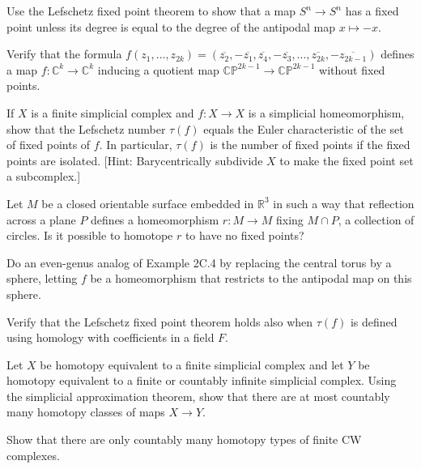 \begin{exercise}
Use the Lefschetz fixed point theorem to show that a map $S^n \to S^n$ has a fixed point unless its degree is equal to the degree of the antipodal map $x \mapsto -x$.
\end{exercise}

\begin{exercise}
Verify that the formula $f(z_1, \ldots, z_{2k}) = (\overline{z_2}, -\overline{z_1}, \overline{z_4}, -\overline{z_3}, \ldots, \overline{z_{2k}}, -\overline{z_{2k-1}})$ defines a map $f: \mathbb{C}^k \to \mathbb{C}^k$ inducing a quotient map $\mathbb{CP}^{2k-1} \to \mathbb{CP}^{2k-1}$ without fixed points.
\end{exercise}

\begin{exercise}
If $X$ is a finite simplicial complex and $f: X \to X$ is a simplicial homeomorphism, show that the Lefschetz number $\tau(f)$ equals the Euler characteristic of the set of fixed points of $f$. In particular, $\tau(f)$ is the number of fixed points if the fixed points are isolated. [Hint: Barycentrically subdivide $X$ to make the fixed point set a subcomplex.]
\end{exercise}

\begin{exercise}
Let $M$ be a closed orientable surface embedded in $\mathbb{R}^3$ in such a way that reflection across a plane $P$ defines a homeomorphism $r: M \to M$ fixing $M \cap P$, a collection of circles. Is it possible to homotope $r$ to have no fixed points?
\end{exercise}

\begin{exercise}
Do an even-genus analog of Example 2C.4 by replacing the central torus by a sphere, letting $f$ be a homeomorphism that restricts to the antipodal map on this sphere.
\end{exercise}

\begin{exercise}
Verify that the Lefschetz fixed point theorem holds also when $\tau(f)$ is defined using homology with coefficients in a field $F$.
\end{exercise}

\begin{exercise}
Let $X$ be homotopy equivalent to a finite simplicial complex and let $Y$ be homotopy equivalent to a finite or countably infinite simplicial complex. Using the simplicial approximation theorem, show that there are at most countably many homotopy classes of maps $X \to Y$.
\end{exercise}

\begin{exercise}
Show that there are only countably many homotopy types of finite CW complexes.
\end{exercise}

